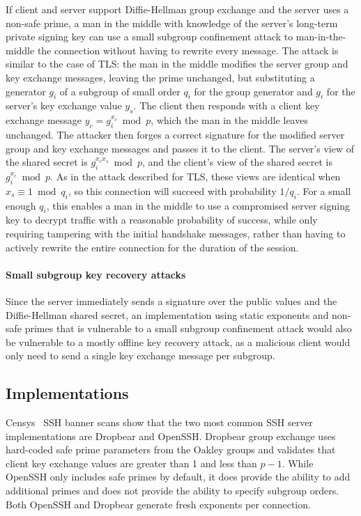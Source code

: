 If client and server support Diffie-Hellman group exchange and the server uses
a non-safe prime, a man in the middle with knowledge of the server's long-term
private signing key can use a small subgroup confinement attack to
man-in-the-middle the connection without having to rewrite every message.  The
attack is similar to the case of TLS: the man in the middle modifies the server
group and key exchange messages, leaving the prime unchanged, but substituting
a generator $g_i$ of a subgroup of small order $q_i$ for the group generator
and $g_i$ for the server's key exchange value $y_s$.  The client then responds
with a client key exchange message $y_c = g_i^{x_c} \bmod p$, which the man in
the middle leaves unchanged.  The attacker then forges a correct signature for
the modified server group and key exchange messages and passes it to the
client.  The server's view of the shared secret is $g_i^{x_c x_s} \bmod p$, and
the client's view of the shared secret is $g_i^{x_c} \bmod p$.  As in the
attack described for TLS, these views are identical when $x_s \equiv 1 \bmod
q_i$, so this connection will succeed with probability $1/q_i$.  For a small
enough $q_i$, this enables a man in the middle to use a compromised server
signing key to decrypt traffic with a reasonable probability of success, while
only requiring tampering with the initial handshake messages, rather than
having to actively rewrite the entire connection for the duration of the
session.

\paragraph{Small subgroup key recovery attacks}
Since the server immediately sends a signature over the public values and the
Diffie-Hellman shared secret, an implementation using static exponents and non-safe primes that is
vulnerable to a small subgroup confinement attack would also be vulnerable to a
mostly offline key recovery attack, as a malicious client would only need to
send a single key exchange message per subgroup.

\subsection{Implementations}

Censys~\cite{censys} SSH banner scans show that the two most common SSH server implementations
are Dropbear and OpenSSH. Dropbear group exchange uses hard-coded safe prime parameters from the Oakley groups and validates that client key exchange values are greater than 1 and less than $p - 1$. While OpenSSH
only includes safe primes by default, it does provide the ability to add additional primes and
does not provide the ability to specify subgroup orders. Both OpenSSH and Dropbear generate fresh
exponents per connection.

